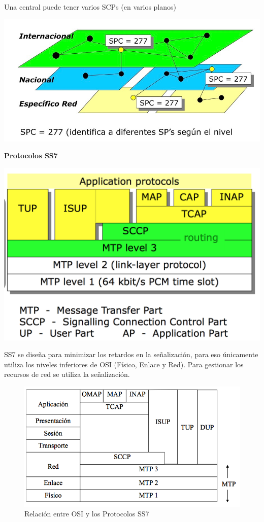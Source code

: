 \documentclass[10pt,portrait, twocolumn]{article}
\begin{document}
Una central puede tener varios SCPs (en varios planos)

	\begin{center}
		\includegraphics[scale = 0.2]{NivelesSS7}
	\end{center}

\textbf{Protocolos SS7}

	\begin{center}
		\includegraphics[scale = 0.3]{SS72}
	\end{center}

SS7 se diseña para minimizar los retardos en la señalización, para eso únicamente utiliza los niveles inferiores de OSI (Físico, Enlace y Red). Para gestionar los recursos de red se utiliza la señalización.
	
	\begin{figure}[!ht]
 		\centering
  		 \includegraphics[scale = 0.5]{images/SS7OSI}
		\caption{Relación entre OSI y los Protocolos SS7}
	\end{figure}
\end{document}
